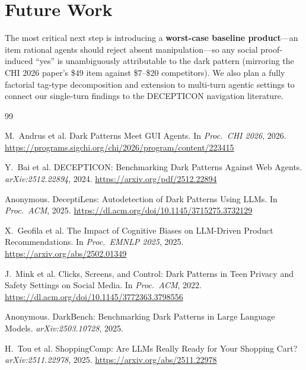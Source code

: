\documentclass[11pt]{article}
\begin{document}
\section{Future Work}

The most critical next step is introducing a \textbf{worst-case baseline product}---an item rational agents should reject absent manipulation---so any social proof-induced ``yes'' is unambiguously attributable to the dark pattern (mirroring the CHI 2026 paper's \$49 item against \$7--\$20 competitors). We also plan a fully factorial tag-type decomposition and extension to multi-turn agentic settings to connect our single-turn findings to the DECEPTICON navigation literature.

\clearpage

\begin{thebibliography}{99}

M.\ Andrus et al.
\newblock Dark Patterns Meet GUI Agents.
\newblock In \textit{Proc.\ CHI 2026}, 2026.
\newblock \url{https://programs.sigchi.org/chi/2026/program/content/223415}

Y.\ Bai et al.
\newblock DECEPTICON: Benchmarking Dark Patterns Against Web Agents.
\newblock \textit{arXiv:2512.22894}, 2024.
\newblock \url{https://arxiv.org/pdf/2512.22894}

Anonymous.
\newblock DeceptiLens: Autodetection of Dark Patterns Using LLMs.
\newblock In \textit{Proc.\ ACM}, 2025.
\newblock \url{https://dl.acm.org/doi/10.1145/3715275.3732129}

X.\ Geofila et al.
\newblock The Impact of Cognitive Biases on LLM-Driven Product Recommendations.
\newblock In \textit{Proc.\ EMNLP 2025}, 2025.
\newblock \url{https://arxiv.org/abs/2502.01349}

J.\ Mink et al.
\newblock Clicks, Screens, and Control: Dark Patterns in Teen Privacy and Safety Settings on Social Media.
\newblock In \textit{Proc.\ ACM}, 2022.
\newblock \url{https://dl.acm.org/doi/10.1145/3772363.3798556}

Anonymous.
\newblock DarkBench: Benchmarking Dark Patterns in Large Language Models.
\newblock \textit{arXiv:2503.10728}, 2025.

H.\ Tou et al.
\newblock ShoppingComp: Are LLMs Really Ready for Your Shopping Cart?
\newblock \textit{arXiv:2511.22978}, 2025.
\newblock \url{https://arxiv.org/abs/2511.22978}


\end{thebibliography}
\end{document}
